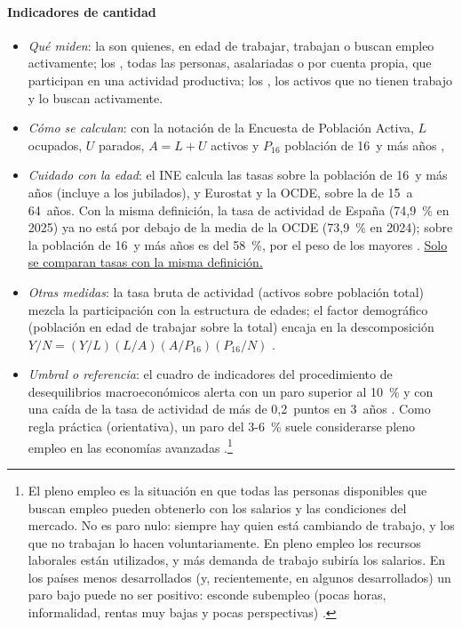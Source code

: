 \documentclass[11pt]{article}
\begin{document}
\paragraph{Indicadores de cantidad}
\begin{itemize}
\item \emph{Qué miden}: la  son quienes, en edad de trabajar, trabajan o buscan empleo activamente; los , todas las personas, asalariadas o por cuenta propia, que participan en una actividad productiva; los , los activos que no tienen trabajo y lo buscan activamente.
\item \emph{Cómo se calculan}: con la notación de la Encuesta de Población Activa, $L$ ocupados, $U$ parados, $A=L+U$ activos y $P_{16}$ población de 16~y más años ,
\item \emph{Cuidado con la edad}: el INE calcula las tasas sobre la población de 16~y más años (incluye a los jubilados), y Eurostat y la OCDE, sobre la de 15~a 64~años. Con la misma definición, la tasa de actividad de España (74,9~\% en 2025) ya no está por debajo de la media de la OCDE (73,9~\% en 2024); sobre la población de 16~y más años es del 58~\%, por el peso de los mayores \parencite{OCDE2026LFS,Eurostat2026lfsa,INE2025EPA}. \uline{Solo se comparan tasas con la misma definición.}
\item \emph{Otras medidas}: la tasa bruta de actividad (activos sobre población total) mezcla la participación con la estructura de edades; el factor demográfico (población en edad de trabajar sobre la total) encaja en la descomposición $Y/N=(Y/L)(L/A)(A/P_{16})(P_{16}/N)$ .
\item \emph{Umbral o referencia}: el cuadro de indicadores del procedimiento de desequilibrios macroeconómicos alerta con un paro superior al 10~\% y con una caída de la tasa de actividad de más de 0,2~puntos en 3~años \parencite{CE2025AMR2026}. Como regla práctica (orientativa), un paro del 3-6~\% suele considerarse pleno empleo en las economías avanzadas \parencite{OIT2019PlenoEmpleo}.\footnote{El pleno empleo es la situación en que todas las personas disponibles que buscan empleo pueden obtenerlo con los salarios y las condiciones del mercado. No es paro nulo: siempre hay quien está cambiando de trabajo, y los que no trabajan lo hacen voluntariamente. En pleno empleo los recursos laborales están utilizados, y más demanda de trabajo subiría los salarios. En los países menos desarrollados (y, recientemente, en algunos desarrollados) un paro bajo puede no ser positivo: esconde subempleo (pocas horas, informalidad, rentas muy bajas y pocas perspectivas) \parencite{OIT2019PlenoEmpleo}.}

\end{itemize}
\end{document}
